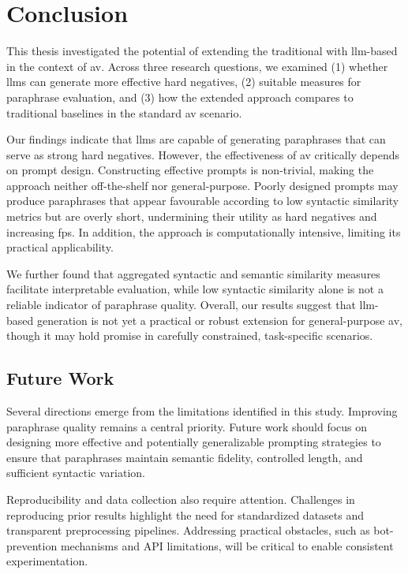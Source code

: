 \chapter{Conclusion}
\label{chap:conclusion}

This thesis investigated the potential of extending the traditional \impAppr{} with \ac{llm}-based \imps{} in the context of \ac{av}. 
Across three research questions, we examined (1) whether \acp{llm} can generate more effective hard negatives, (2) suitable measures for paraphrase evaluation, and (3) how the extended approach compares to traditional baselines in the standard \ac{av} scenario.  

Our findings indicate that \acp{llm} are capable of generating paraphrases that can serve as strong hard negatives. 
However, the effectiveness of \ac{av} critically depends on prompt design. 
Constructing effective prompts is non-trivial, making the approach neither off-the-shelf nor general-purpose. 
Poorly designed prompts may produce paraphrases that appear favourable according to low syntactic similarity metrics but are overly short, undermining their utility as hard negatives and increasing \acp{fp}. 
In addition, the approach is computationally intensive, limiting its practical applicability.  

We further found that aggregated syntactic and semantic similarity measures facilitate interpretable evaluation, while low syntactic similarity alone is not a reliable indicator of paraphrase quality. 
Overall, our results suggest that \ac{llm}-based \imp{} generation is not yet a practical or robust extension for general-purpose \ac{av}, though it may hold promise in carefully constrained, task-specific scenarios.  



\section{Future Work}

Several directions emerge from the limitations identified in this study. 
Improving paraphrase quality remains a central priority. 
Future work should focus on designing more effective and potentially generalizable prompting strategies to ensure that paraphrases maintain semantic fidelity, controlled length, and sufficient syntactic variation.  

Reproducibility and data collection also require attention. 
Challenges in reproducing prior results highlight the need for standardized datasets and transparent preprocessing pipelines. 
Addressing practical obstacles, such as bot-prevention mechanisms and API limitations, will be critical to enable consistent experimentation.  

